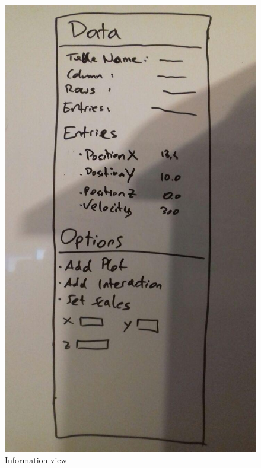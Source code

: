 \documentclass{article}
\begin{document}
\begin{figure}
\includegraphics[width=\textwidth]{InformationView.jpg}
	\caption{Information view}
	\label{fig2}
\end{figure}
\end{document}
